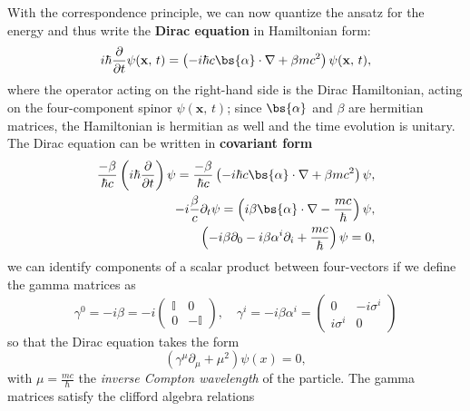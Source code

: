 With the correspondence principle, we can now quantize the ansatz for the energy and thus write the \textbf{Dirac equation} in Hamiltonian form:
\begin{equation}
    i \hbar \frac{\partial}{\partial t} \psi(\mathbf{x},\,t) = \left(-i \hbar c \bs{\alpha} \cdot \nabla + \beta m c^2 \right) \psi(\mathbf{x},\,t),
    \label{eq:dirac_equation_hamiltonian}
\end{equation}
where the operator acting on the right-hand side is the Dirac Hamiltonian, acting on the four-component spinor \(\psi(\mathbf{x},\,t)\); since \(\bs{\alpha}\) and \(\beta\) are hermitian matrices, the Hamiltonian is hermitian as well and the time evolution is unitary. The Dirac equation can be written in \textbf{covariant form}
\[
    \begin{aligned}
        \frac{-\beta}{\hbar c} \left(i \hbar \frac{\partial}{\partial t} \right) \psi  = \frac{-\beta}{\hbar c} \left(-i \hbar c \bs{\alpha} \cdot \nabla + \beta m c^2 \right) \psi, \\
        -i \frac{\beta}{c} \partial_t \psi = \left(i \beta \bs{\alpha} \cdot \nabla - \frac{mc}{\hbar}\right) \psi,                                                                   \\
        \left( -i \beta \partial_0 -i \beta \alpha^i \partial_i + \frac{mc}{\hbar} \right) \psi = 0,
    \end{aligned}
\]
we can identify components of a scalar product between four-vectors if we define the gamma matrices as
\begin{equation}
    \gamma^0 = -i\beta = -i \begin{pmatrix}
        \mathbb{I} & 0           \\
        0          & -\mathbb{I}
    \end{pmatrix}, \quad \gamma^i = -i \beta \alpha^i = \begin{pmatrix}
        0          & -i \sigma^i \\
        i \sigma^i & 0
    \end{pmatrix}
    \label{eq:gamma_matrices_dirac_rep}
\end{equation}
so that the Dirac equation takes the form
\begin{equation}
    (\gamma^{\mu} \partial_{\mu} + \mu^2) \psi(x) = 0,
    \label{eq:dirac_equation_covariant}
\end{equation}
with \(\mu = \frac{m c}{\hbar}\) the \textit{inverse Compton wavelength} of the particle. The gamma matrices satisfy the clifford algebra relations
